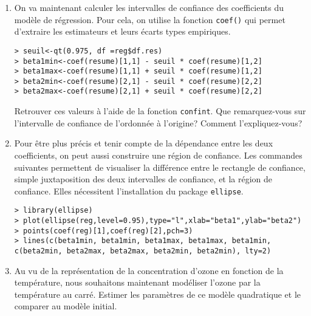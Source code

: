 \documentclass{td_um}
\providecommand{\1}{\mathds{1}}
\begin{document}
\begin{enumerate}
\item On va maintenant calculer les intervalles de confiance des coefficients du modèle de régression. Pour cela, on utilise la fonction \texttt{coef()} qui permet d'extraire les estimateurs et leurs écarts types empiriques.
\begin{verbatim}
> seuil<-qt(0.975, df =reg$df.res)
> beta1min<-coef(resume)[1,1] - seuil * coef(resume)[1,2]
> beta1max<-coef(resume)[1,1] + seuil * coef(resume)[1,2]
> beta2min<-coef(resume)[2,1] - seuil * coef(resume)[2,2]
> beta2max<-coef(resume)[2,1] + seuil * coef(resume)[2,2]
\end{verbatim}
Retrouver ces valeurs à l'aide de la fonction \texttt{confint}. Que remarquez-vous sur l'intervalle de confiance de l'ordonnée à l'origine? Comment l'expliquez-vous?
\item Pour être plus précis et tenir compte de la dépendance entre les deux coefficients, on peut aussi construire une région de confiance. Les commandes suivantes permettent de visualiser la différence entre le rectangle de confiance, simple juxtaposition des deux intervalles de confiance, et la région de confiance. Elles nécessitent l'installation du package \texttt{ellipse}.
    \begin{verbatim}
> library(ellipse)
> plot(ellipse(reg,level=0.95),type="l",xlab="beta1",ylab="beta2")
> points(coef(reg)[1],coef(reg)[2],pch=3)
> lines(c(beta1min, beta1min, beta1max, beta1max, beta1min, c(beta2min, beta2max, beta2max, beta2min, beta2min), lty=2)
\end{verbatim}
\item Au vu de la représentation de la concentration d'ozone en fonction de la température, nous souhaitons maintenant modéliser l'ozone par la température au carré. Estimer les paramètres de ce modèle quadratique et le comparer au modèle initial.
\end{enumerate}

\end{document}
